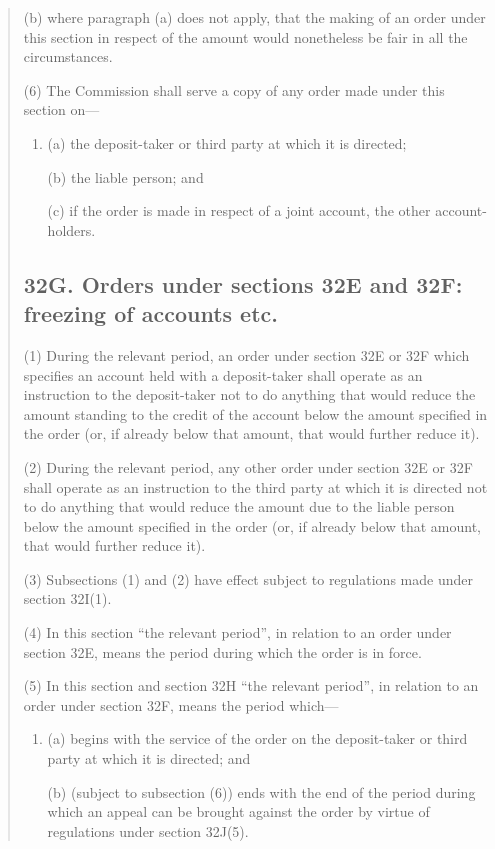 \documentclass[a4paper]{article}
\begin{document}
\begin{quotation}
\begin{enumerate}
(b) where paragraph (a) does not apply, that the making of an order under this section in respect of the amount would nonetheless be fair in all the circumstances.
\end{enumerate}

(6) The Commission shall serve a copy of any order made under this section on---
\begin{enumerate}\item[]
(a) the deposit-taker or third party at which it is directed;

(b) the liable person; and

(c) if the order is made in respect of a joint account, the other account-holders.
\end{enumerate}

\subsection*{32G. Orders under sections 32E and 32F: freezing of accounts etc.}

(1) During the relevant period, an order under section 32E or 32F which
specifies an account held with a deposit-taker shall operate as an instruction to the deposit-taker not to do anything that would reduce the amount standing to the credit of the account below the amount specified in the order (or, if already below that amount, that would further reduce it).

(2)
During the relevant period, any other order under section 32E or 32F shall operate as an instruction to the third party at which it is directed not to do anything that would reduce the amount due to the liable person below the amount specified in the order (or, if already below that amount, that would further reduce it).

(3)
Subsections (1) and (2) have effect subject to regulations made under section 32I(1).

(4)
In this section “the relevant period”, in relation to an order under section 32E, means the period during which the order is in force.

(5)
In this section and section 32H “the relevant period”, in relation to an order under section 32F, means the period which---
\begin{enumerate}\item[]
(a) begins with the service of the order on the deposit-taker or third party at which it is directed; and

(b) (subject to subsection (6)) ends with the end of the period during which an appeal can be brought against the order by virtue of regulations under section 32J(5).
\end{enumerate}


\end{quotation}
\end{document}
